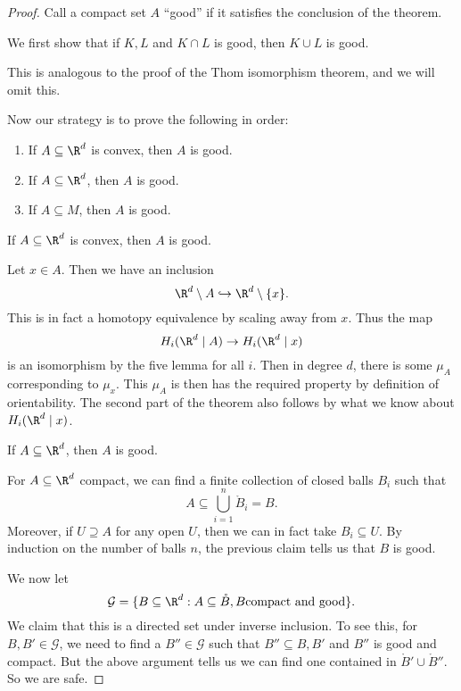\documentclass[a4paper]{article}
\begin{document}
\begin{proof}
  Call a compact set $A$ ``good'' if it satisfies the conclusion of the theorem.

  \begin{claim}
    We first show that if $K, L$ and $K \cap L$ is good, then $K \cup L$ is good.
  \end{claim}
  This is analogous to the proof of the Thom isomorphism theorem, and we will omit this.

  Now our strategy is to prove the following in order:
  \begin{enumerate}
    \item If $A \subseteq \R^d$ is convex, then $A$ is good.
    \item If $A \subseteq \R^d$, then $A$ is good.
    \item If $A \subseteq M$, then $A$ is good.
  \end{enumerate}

  \begin{claim}
    If $A \subseteq \R^d$ is convex, then $A$ is good.
  \end{claim}
  Let $x \in A$. Then we have an inclusion
  \[
    \R^d \setminus A \hookrightarrow \R^d \setminus \{x\}.
  \]
  This is in fact a homotopy equivalence by scaling away from $x$. Thus the map
  \[
    H_i(\R^d \mid A) \to H_i(\R^d \mid x)
  \]
  is an isomorphism by the five lemma for all $i$. Then in degree $d$, there is some $\mu_A$ corresponding to $\mu_x$. This $\mu_A$ is then has the required property by definition of orientability. The second part of the theorem also follows by what we know about $H_i(\R^d \mid x)$.

  \begin{claim}
    If $A \subseteq \R^d$, then $A$ is good.
  \end{claim}
  For $A \subseteq \R^d$ compact, we can find a finite collection of closed balls $B_i$ such that
  \[
    A \subseteq \bigcup_{i = 1}^n \mathring{B}_i = B.
  \]
  Moreover, if $U \supseteq A$ for any open $U$, then we can in fact take $B_i \subseteq U$. By induction on the number of balls $n$, the previous claim tells us that $B$ is good.

  We now let
  \[
    \mathcal{G} = \{B \subseteq \R^d: A \subseteq \mathring{B}, B\text{compact and good}\}.
  \]
  We claim that this is a directed set under inverse inclusion. To see this, for $B, B' \in \mathcal{G}$, we need to find a $B'' \in \mathcal{G}$ such that $B'' \subseteq B, B'$ and $B''$ is good and compact. But the above argument tells us we can find one contained in $\mathring{B}' \cup \mathring{B}''$. So we are safe.


\end{proof}
\end{document}
